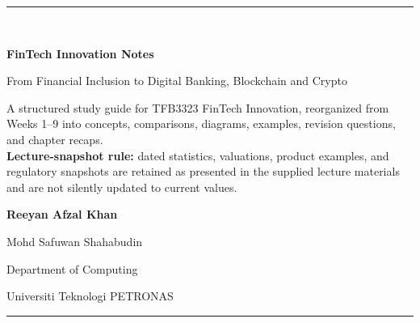 \documentclass[11pt,oneside,a4paper]{report}
\begin{document}
\hypersetup{pageanchor=false}

\begin{titlepage}
\centering
\vspace*{1.1cm}
{\color{MLTeal}\rule{0.72\linewidth}{2pt}}\\[1.0cm]
{\Huge\bfseries\color{MLNavy} FinTech Innovation Notes\par}
\vspace{0.35cm}
{\LARGE\color{MLBlue} From Financial Inclusion to Digital Banking, Blockchain and Crypto\par}
\vspace{0.8cm}
\vfill
\begin{tcolorbox}[width=0.82\linewidth,colback=MLPaleOrange,colframe=MLOrange,arc=2mm,boxrule=0.16pt]
\centering\small
A structured study guide for TFB3323 FinTech Innovation, reorganized from Weeks 1--9 into concepts, comparisons, diagrams, examples, revision questions, and chapter recaps.\\[0.3em]
\textbf{Lecture-snapshot rule:} dated statistics, valuations, product examples, and regulatory snapshots are retained as presented in the supplied lecture materials and are not silently updated to current values.
\end{tcolorbox}
\vfill
{\Large\bfseries Reeyan Afzal Khan\par Mohd Safuwan Shahabudin \par}
\vspace{0.5cm}
{\color{MLMuted} Department of Computing \par}
{\color{MLMuted} Universiti Teknologi PETRONAS}
\vspace{0.8cm}
{\color{MLTeal}\rule{0.72\linewidth}{2pt}}
\end{titlepage}
\end{document}
